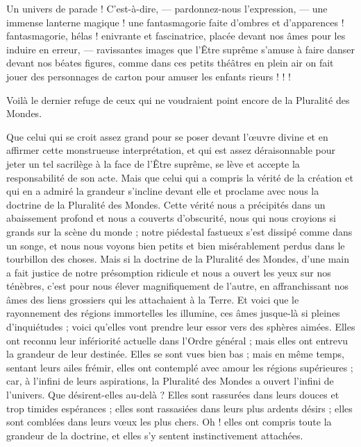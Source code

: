 \documentclass[a4paper, 11pt, oneside, landscape]{article}
\begin{document}
Un univers de parade ! C'est-à-dire, --- pardonnez-nous l'expression, --- une immense lanterne magique ! une fantasmagorie faite d'ombres et d'apparences ! fantasmagorie, hélas ! enivrante et fascinatrice, placée devant nos âmes pour les induire en erreur, --- ravissantes images que l'Être suprême s'amuse à faire danser devant nos béates figures, comme dans ces petits théâtres en plein air on fait jouer des personnages de carton pour amuser les enfants rieurs ! ! !

Voilà le dernier refuge de ceux qui ne voudraient point encore de la Pluralité des Mondes.

Que celui qui se croit assez grand pour se poser devant l'œuvre divine et en affirmer cette monstrueuse interprétation, et qui est assez déraisonnable pour jeter un tel sacrilège à la face de l'Être suprême, se lève et accepte la responsabilité de son acte. Mais que celui qui a compris la vérité de la création et qui en a admiré la grandeur s'incline devant elle et proclame avec nous la doctrine de la Pluralité des Mondes. Cette vérité nous a précipités dans un abaissement profond et nous a couverts d'obscurité, nous qui nous croyions si grands sur la scène du monde ; notre piédestal fastueux s'est dissipé comme dans un songe, et nous nous voyons bien petits et bien misérablement perdus dans le tourbillon des choses. Mais si la doctrine de la Pluralité des Mondes, d'une main a fait justice de notre présomption ridicule et nous a ouvert les yeux sur nos ténèbres, c'est pour nous élever magnifiquement de l'autre, en affranchissant nos âmes des liens grossiers qui les attachaient à la Terre. Et voici que le rayonnement des régions immortelles les illumine, ces âmes jusque-là si pleines d'inquiétudes ; voici qu'elles vont prendre leur essor vers des sphères aimées. Elles ont reconnu leur infériorité actuelle dans l'Ordre général ; mais elles ont entrevu la grandeur de leur destinée. Elles se sont vues bien bas ; mais en même temps, sentant leurs ailes frémir, elles ont contemplé avec amour les régions supérieures ; car, à l'infini de leurs aspirations, la Pluralité des Mondes a ouvert l'infini de l'univers. Que désirent-elles au-delà ? Elles sont rassurées dans leurs douces et trop timides espérances ; elles sont rassasiées dans leurs plus ardents désirs ; elles sont comblées dans leurs vœux les plus chers. Oh ! elles ont compris toute la grandeur de la doctrine, et elles s'y sentent instinctivement attachées.
\end{document}
